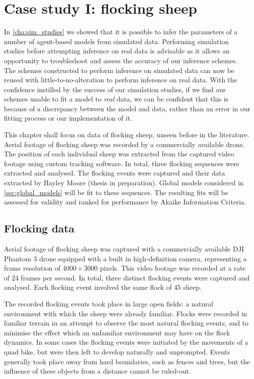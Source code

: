 \graphicspath{{fig/sheep/}}

\chapter{Case study I: flocking sheep}
\label{cha:sheep}

In \cref{cha:sim_studies} we showed that it is possible to infer the parameters
of a number of agent-based models from simulated data. Performing simulation
studies before attempting inference on real data is advisable as it allows an
opportunity to troubleshoot and assess the accuracy of our inference schemes.
The schemes constructed to perform inference on simulated data can now be
reused with little-to-no-alteration to perform inference on real data. With the
confidence instilled by the success of our simulation studies, if we find our
schemes unable to fit a model to \emph{real} data, we can be confident that
this is because of a discrepancy between the model and data, rather than an
error in our fitting process or our implementation of it.

This chapter shall focus on data of flocking sheep, unseen before in the
literature. Aerial footage of flocking sheep was recorded by a commercially
available drone. The position of each individual sheep was extracted from the
captured video footage using custom tracking software. In total, three flocking
sequences were extracted and analysed. The flocking events were captured and
their data extracted by Hayley Moore (thesis in preparation). Global models
considered in \cref{sec:global_models} will be fit to these sequences. The
resulting fits will be assessed for validity and ranked for performance by
Akaike Information Criteria.

\section{Flocking data}
\label{sec:data}

Aerial footage of flocking sheep was captured with a commercially available DJI
Phantom $3$ drone equipped with a built in high-definition camera, representing
a frame resolution of $4000\times3000$ pixels. This video footage was recorded
at a rate of $24$ frames per second. In total, three distinct flocking events
were captured and analysed. Each flocking event involved the same flock of $45$
sheep.

The recorded flocking events took place in large open fields: a natural
environment with which the sheep were already familiar. Flocks were recorded in
familiar terrain in an attempt to observe the most natural flocking events, and
to minimise the effect which an unfamiliar environment may have on the flock
dynamics. In some cases the flocking events were initiated by the movements of
a quad bike, but were then left to develop naturally and unprompted. Events
generally took place away from hard boundaries, such as fences and trees, but
the influence of these objects from a distance cannot be ruled-out.

